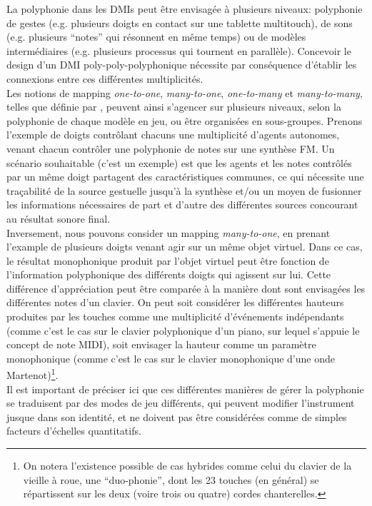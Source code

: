 \noindent La polyphonie dans les \glspl{DMI} peut être envisagée à plusieurs niveaux: polyphonie de gestes (e.g. plusieurs doigts en contact sur une tablette multitouch), de sons (e.g. plusieurs ``notes'' qui résonnent en même temps) ou de modèles intermédiaires (e.g. plusieurs processus qui tournent en parallèle). Concevoir le design d'un \gls{DMI} poly-poly-polyphonique nécessite par conséquence d'établir les connexions entre ces différentes multiplicités.\\
\indent Les notions de mapping \textit{one-to-one}, \textit{many-to-one}, \textit{one-to-many} et \textit{many-to-many}, telles que définie par \cite{hunt_mapping_2002}, peuvent ainsi s'agencer sur plusieurs niveaux, selon la polyphonie de chaque modèle en jeu, ou être organisées en sous-groupes. Prenons l'exemple de doigts contrôlant chacuns une multiplicité d'agents autonomes, venant chacun contrôler une polyphonie de notes sur une synthèse \gls{FM}. Un scénario souhaitable (c'est un exemple) est que les agents et les notes contrôlés par un même doigt partagent des caractéristiques communes, ce qui nécessite une traçabilité de la source gestuelle jusqu'à la synthèse et/ou un moyen de fusionner les informations nécessaires de part et d'autre des différentes sources concourant au résultat sonore final.\\
\indent Inversement, nous pouvons consider un mapping \textit{many-to-one}, en prenant l'example de plusieurs doigts venant agir sur un même objet virtuel. Dans ce cas, le résultat monophonique produit par l'objet virtuel peut être fonction de l'information polyphonique des différents doigts qui agissent sur lui. Cette différence d'appréciation peut être comparée à la manière dont sont envisagées les différentes notes d'un clavier. On peut soit considérer les différentes hauteurs produites par les touches comme une multiplicité d'événements indépendants (comme c'est le cas sur le clavier polyphonique d'un piano, sur lequel s'appuie le concept de note \gls{MIDI}), soit envisager la hauteur comme un paramètre monophonique (comme c'est le cas sur le clavier monophonique d'une onde Martenot)\footnote{On notera l'existence possible de cas hybrides comme celui du clavier de la vieille à roue, une ``duo-phonie'', dont les 23 touches (en général) se répartissent sur les deux (voire trois ou quatre) cordes chanterelles.}.\\
\indent Il est important de préciser ici que ces différentes manières de gérer la polyphonie se traduisent par des modes de jeu différents, qui peuvent modifier l'instrument jusque dans son identité, et ne doivent pas être considérées comme de simples facteurs d'échelles quantitatifs.

